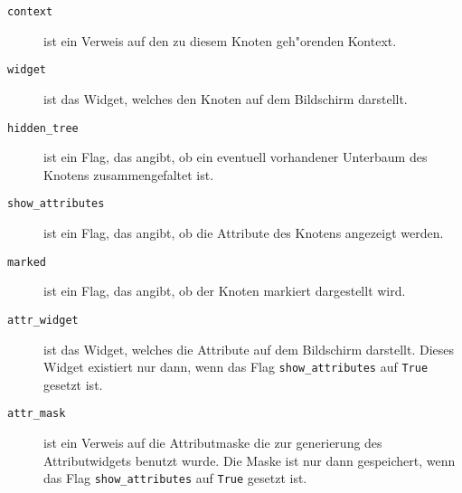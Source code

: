 \begin{description}
\item[\tt context]
   ist ein Verweis auf den zu diesem Knoten geh"orenden Kontext.
\item[\tt widget]
   ist das Widget, welches den Knoten auf dem Bildschirm darstellt.
\item[\tt hidden\_tree]
   ist ein Flag, das angibt, ob ein eventuell vorhandener Unterbaum des Knotens
   zusammengefaltet ist.
\item[\tt show\_attributes]
   ist ein Flag, das angibt, ob die Attribute des Knotens angezeigt werden.
\item[\tt marked]
   ist ein Flag, das angibt, ob der Knoten markiert dargestellt wird.
\item[\tt attr\_widget]
   ist das Widget, welches die Attribute auf dem Bildschirm darstellt.
   Dieses Widget existiert nur dann, wenn das Flag {\tt show\_attributes}
   auf {\tt True} gesetzt ist.
\item[\tt attr\_mask]
   ist ein Verweis auf die Attributmaske die zur generierung des 
   Attributwidgets benutzt wurde. Die Maske ist nur dann gespeichert,
   wenn das Flag {\tt show\_attributes} auf {\tt True} gesetzt ist.
\end{description}
